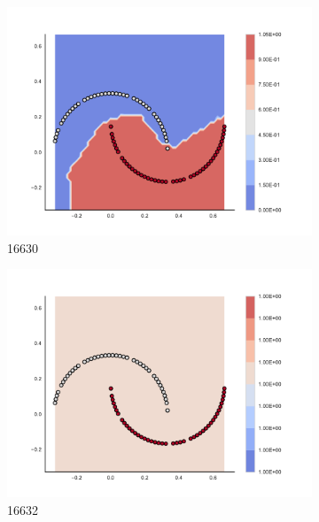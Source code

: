 \begin{figure}[h]
\begin{subfigure}[b]{0.09\textwidth}
    \includegraphics[clip, trim=2.35cm 1.75cm 4.5cm 0cm,width=\textwidth]{img/convergence/16630.pdf}
    \caption{16630}
    \label{fig:convergence_16630}
\end{subfigure}
%
\begin{subfigure}[b]{0.09\textwidth}
    \includegraphics[clip, trim=2.35cm 1.75cm 4.5cm 0cm,width=\textwidth]{img/convergence/16632.pdf}
    \caption{16632}
    \label{fig:convergence_16632}
\end{subfigure}
%
\begin{subfigure}[b]{0.09\textwidth}

\end{subfigure}
\end{figure}
